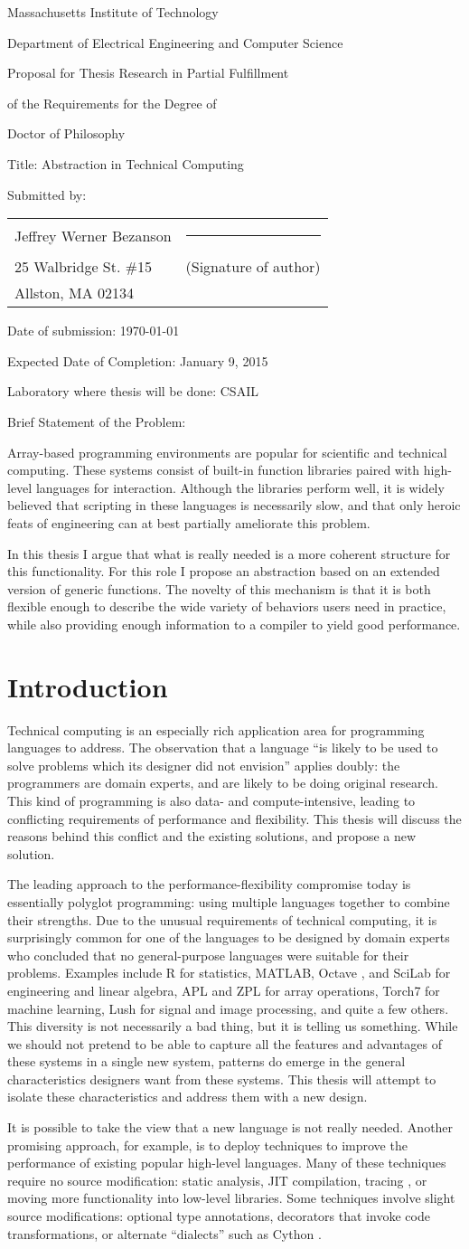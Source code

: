 \documentclass[12pt]{article}
\author & \signatureline \\
\def\author{Jeffrey Werner Bezanson}
\def\addressone{25 Walbridge St. \#15}
\def\addresstwo{Allston, MA 02134}
\def\title{Abstraction in Technical Computing}
\def\expectedcompletetiondate{January 9, 2015}
\def\briefproblemstatement{

Array-based programming environments are popular for scientific and
technical computing.
These systems consist of built-in function libraries paired with high-level
languages for interaction.
Although the libraries perform well, it is widely believed that scripting in these
languages is necessarily slow, and that only heroic feats of engineering can at
best partially ameliorate this problem.

In this thesis I argue that what is really needed is a more coherent
structure for this functionality. For this role I propose an abstraction
based on an extended version of generic functions. The novelty of this
mechanism is that it is both flexible enough to describe the wide
variety of behaviors users need in practice, while also providing
enough information to a compiler to yield good performance.
















}
\def\signatureline{\rule{2.5in}{0.25pt}}
\def\thesisproposalform{
\begin{center}
Massachusetts Institute of Technology

Department of Electrical Engineering and Computer Science

\bigskip

Proposal for Thesis Research in Partial Fulfillment

of the Requirements for the Degree of 

Doctor of Philosophy
\end{center}

\bigskip

Title:  \title

Submitted by: \hfill
\begin{tabular}[t]{p{0.3\textwidth}p{0.4\textwidth}}
\author & \signatureline \\
\addressone & (Signature of author) \\
\addresstwo \\
\end{tabular}

Date of submission:  \today

Expected Date of Completion:  \expectedcompletetiondate

Laboratory where thesis will be done: CSAIL

Brief Statement of the Problem:

\briefproblemstatement 

 \newpage }
\begin{document}
\thesisproposalform

\newpage

\section{Introduction}

Technical computing is an especially rich application area for programming
languages to address. The observation that a language ``is likely to be used to
solve problems which its designer did not envision'' \cite{Liskov:1974pb}
applies doubly: the programmers are domain experts, and are likely to be
doing original research. This kind of programming is also data- and
compute-intensive, leading to conflicting requirements of performance and
flexibility. This thesis will discuss the reasons behind this conflict and
the existing solutions, and propose a new solution.

The leading approach to the performance-flexibility compromise today is
essentially polyglot programming: using multiple languages together to
combine their strengths. Due to the unusual requirements of technical
computing, it is surprisingly common for one of the languages to be
designed by domain experts who concluded that no general-purpose
languages were suitable for their problems. Examples include R \cite{Rlang}
for statistics, MATLAB\textregistered, Octave \cite{octave},
and SciLab \cite{scilab} for engineering and linear algebra, APL \cite{APL}
and ZPL \cite{ZPL} for array operations, Torch7 \cite{collobert2011torch7}
for machine learning, Lush \cite{bottou2002lush} for
signal and image processing, and quite a few others. This diversity is
not necessarily a bad thing, but it is telling us something. While we
should not pretend to be able to capture all the features and advantages
of these systems in a single new system, patterns do emerge in the
general characteristics designers want from these systems. This thesis
will attempt to isolate these characteristics and address them
with a new design.

It is possible to take the view that a new language is not really needed.
Another promising approach, for example, is to deploy
techniques to improve the performance of existing popular high-level
languages. Many of these techniques require
no source modification: static analysis, JIT compilation, tracing \cite{tracingjit},
or moving more functionality into low-level libraries. Some techniques involve
slight source modifications: optional type annotations, decorators that
invoke code transformations, or alternate ``dialects'' such as Cython
\cite{Behnel:2011}.
\end{document}
